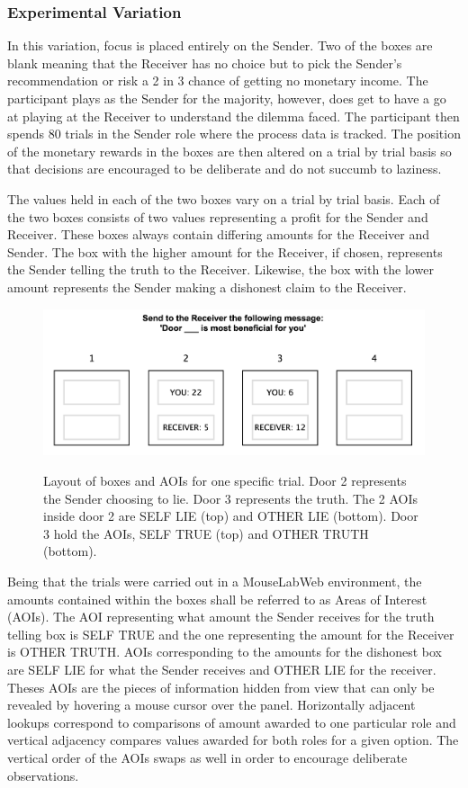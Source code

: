 \documentclass[man, floatsintext]{apa7}
\begin{document}
\subsubsection{Experimental Variation}

In this variation, focus is placed entirely on the Sender. Two of the boxes are blank meaning that the Receiver has no choice but to pick the Sender's recommendation or risk a 2 in 3 chance of getting no monetary income. The participant plays as the Sender for the majority, however, does get to have a go at playing at the Receiver to understand the dilemma faced. The participant then spends 80 trials in the Sender role where the process data is tracked. The position of the monetary rewards in the boxes are then altered on a trial by trial basis so that decisions are encouraged to be deliberate and do not succumb to laziness. 

The values held in each of the two boxes vary on a trial by trial basis. Each of the two boxes consists of two values representing a profit for the Sender and Receiver. These boxes always contain differing amounts for the Receiver and Sender. The box with the higher amount for the Receiver, if chosen, represents the Sender telling the truth to the Receiver. Likewise, the box with the lower amount represents the Sender making a dishonest claim to the Receiver.

\begin{figure}[H]
	\centering
	\includegraphics[width=0.75\linewidth]{figures/NOT HIDDEN.png}
	\label{fig:AOIs}
	\caption{Layout of boxes and AOIs for one specific trial. Door 2 represents the Sender choosing to lie. Door 3 represents the truth. The 2 AOIs inside door 2 are SELF LIE (top) and OTHER LIE (bottom). Door 3 hold the AOIs, SELF TRUE (top) and OTHER TRUTH (bottom).}
\end{figure}


Being that the trials were carried out in a MouseLabWeb environment, the amounts contained within the boxes shall be referred to as Areas of Interest (AOIs). The AOI representing what amount the Sender receives for the truth telling box is SELF TRUE and the one representing the amount for the Receiver is OTHER TRUTH. AOIs corresponding to the amounts for the dishonest box are SELF LIE for what the Sender receives and OTHER LIE for the receiver. Theses AOIs are the pieces of information hidden from view that can only be revealed by hovering a mouse cursor over the panel. Horizontally adjacent lookups correspond to comparisons of amount awarded to one particular role and vertical adjacency compares values awarded for both roles for a given option. The vertical order of the AOIs swaps as well in order to encourage deliberate observations.
\end{document}

